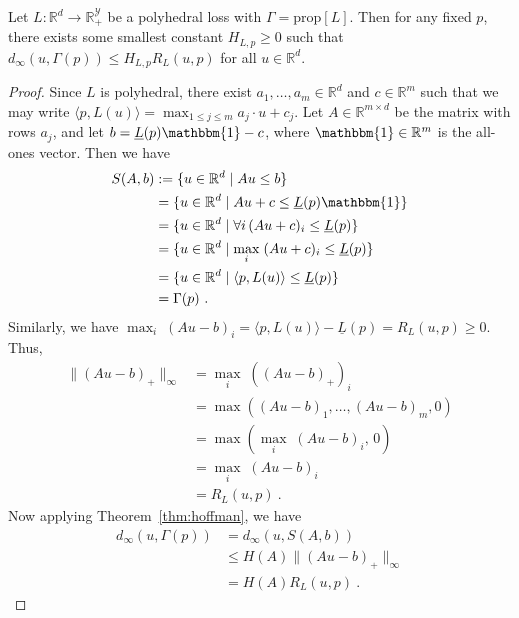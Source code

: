 \documentclass[twoside,11pt]{article}
\newcommand{\reals}{\mathbb{R}}
\newcommand{\prop}[1]{\mathrm{prop}[#1]}
\newcommand{\Y}{\mathcal{Y}}
\newcommand{\risk}[1]{\underline{#1}}
\newcommand{\inprod}[2]{\langle #1, #2 \rangle}%
\newcommand{\ones}{\mathbbm{1}}
\newcommand{\regret}[3]{R_{#1}(#2,#3)}
\begin{document}
\begin{lemma}\label{lem:hoffman-polyhedral}
  Let $L: \reals^d \to \reals_+^{\Y}$ be a polyhedral loss with $\Gamma = \prop{L}$.
  Then for any fixed $p$, there exists some smallest constant $H_{L,p} \geq 0$ such that $d_{\infty}(u,\Gamma(p)) \leq H_{L,p} R_L(u,p)$ for all $u \in \reals^d$.
\end{lemma}
\begin{proof}
  Since $L$ is polyhedral, there exist $a_1,\ldots,a_m \in \reals^d$ and $c\in\reals^m$ such that we may write $\inprod{p}{L(u)} = \max_{1\leq j\leq m} a_j \cdot u + c_j$.
  Let $A \in \reals^{m\times d}$ be the matrix with rows $a_j$, and let $b = \risk{L}(p)\ones - c$, where $\ones\in\reals^m$ is the all-ones vector.
  Then we have
  \begin{align*}
    S(A,b)
    &:= \{u\in\reals^d \mid A u \leq b\}
    \\
    &= \{u\in\reals^d \mid A u + c \leq \risk{L}(p)\ones\}
    \\
    &= \{u\in\reals^d \mid \forall i\, (A u + c)_i \leq \risk{L}(p)\}
    \\
    &= \{u\in\reals^d \mid \max_i \;(A u + c)_i \leq \risk{L}(p)\}
    \\
    &= \{u\in\reals^d \mid \inprod{p}{L(u)} \leq \risk{L}(p)\}
    \\
    & = \Gamma(p)~.
  \end{align*}
  Similarly, we have $\max_i\; (A u - b)_i = \inprod{p}{L(u)} - \risk{L}(p) = \regret{L}{u}{p} \geq 0$.
  Thus,
  \begin{align*}
    \|(Au - b)_+\|_\infty
    &= \max_i\; ((Au - b)_+)_i
    \\
    &= \max((Au - b)_1,\ldots,(Au - b)_m, 0)
    \\
    &= \max(\max_i\; (Au - b)_i, \, 0)
    \\
    &= \max_i\; (Au - b)_i
    \\
    &= \regret{L}{u}{p}~.
  \end{align*}
  Now applying Theorem~\ref{thm:hoffman}, we have
  \begin{align*}
    d_\infty(u,\Gamma(p))
    &=    d_\infty(u,S(A,b))
    \\
    &\leq H(A) \|(Au-b)_+\|_\infty
    \\
    &= H(A) \regret{L}{u}{p}~.
  \end{align*}
\end{proof}
\end{document}
